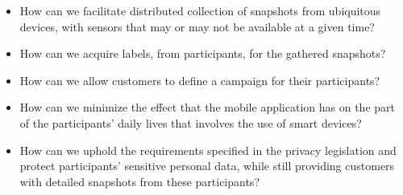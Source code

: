 



\begin{itemize}
	\setlength\itemsep{-0.2em}
    \item How can we facilitate distributed collection of snapshots from ubiquitous devices, with sensors that may or may not be available at a given time?

    \item How can we acquire labels, from participants, for the gathered snapshots?  
    
    \item How can we allow customers to define a campaign for their participants?
    
    \item How can we minimize the effect that the mobile application has on the part of the participants' daily lives that involves the use of smart devices?

    \item How can we uphold the requirements specified in the privacy legislation and protect participants' sensitive personal data, while still providing customers with detailed snapshots from these participants? 
\end{itemize}

